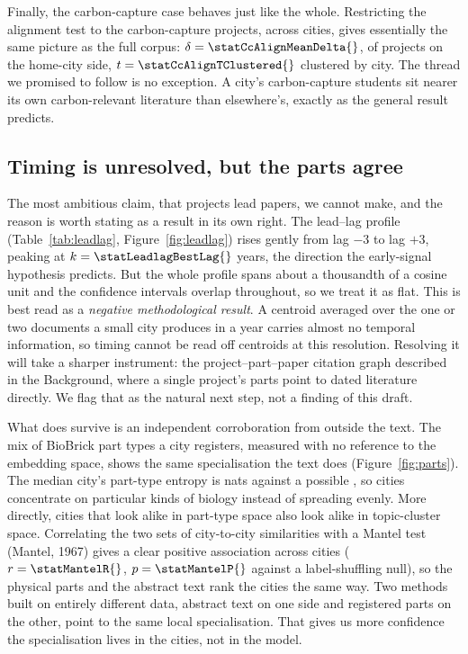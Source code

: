 \documentclass[12pt,a4paper]{article}
\begin{document}
	Finally, the carbon-capture case behaves just like the whole. Restricting the
	alignment test to the \statCcAlignN{} carbon-capture projects, across
	\statCcAlignNCities{} cities, gives essentially the same picture as the full
	corpus: $\delta = \statCcAlignMeanDelta{}$, \statCcAlignFracPos{} of projects on
	the home-city side, $t = \statCcAlignTClustered{}$ clustered by city. The thread we
	promised to follow is no exception. A city's carbon-capture students sit nearer its
	own carbon-relevant literature than elsewhere's, exactly as the general result
	predicts.
	
	\subsection{Timing is unresolved, but the parts agree}
	
	The most ambitious claim, that projects lead papers, we cannot make, and the reason
	is worth stating as a result in its own right. The lead--lag profile
	(Table~\ref{tab:leadlag}, Figure~\ref{fig:leadlag}) rises gently from lag $-3$ to
	lag $+3$, peaking at $k = \statLeadlagBestLag{}$ years, the direction the
	early-signal hypothesis predicts. But the whole profile spans about a thousandth of
	a cosine unit and the confidence intervals overlap throughout, so we treat it as
	flat. This is best read as a \textit{negative methodological result}. A centroid
	averaged over the one or two documents a small city produces in a year carries
	almost no temporal information, so timing cannot be read off centroids at this
	resolution. Resolving it will take a sharper instrument: the project--part--paper
	citation graph described in the Background, where a single project's parts point to
	dated literature directly. We flag that as the natural next step, not a finding of
	this draft.
	
	What does survive is an independent corroboration from outside the text. The mix of
	BioBrick part types a city registers, measured with no reference to the embedding
	space, shows the same specialisation the text does (Figure~\ref{fig:parts}). The
	median city's part-type entropy is \statPartEntropyMedian{} nats against a possible
	\statPartEntropyMax{}, so cities concentrate on particular kinds of biology instead
	of spreading evenly. More directly, cities that look alike in part-type space also
	look alike in topic-cluster space. Correlating the two sets of city-to-city
	similarities with a Mantel test (Mantel, 1967) gives a clear positive association
	across \statMantelNCities{} cities ($r = \statMantelR{}$, $p = \statMantelP{}$
	against a label-shuffling null), so the physical parts and the abstract text rank
	the cities the same way. Two methods built on entirely different data, abstract text
	on one side and registered parts on the other, point to the same local
	specialisation. That gives us more confidence the specialisation lives in the
	cities, not in the model.
	
\end{document}
